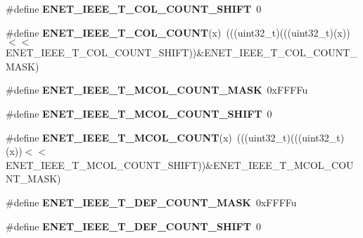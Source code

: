 \begin{DoxyCompactItemize}
\item 
\#define {\bfseries E\+N\+E\+T\+\_\+\+I\+E\+E\+E\+\_\+\+T\+\_\+C\+O\+L\+\_\+\+C\+O\+U\+N\+T\+\_\+\+S\+H\+I\+FT}~0\hypertarget{group__ENET__Register__Masks_ga5d76cc219ed04226ca7b8049d9acf2d6}{}\label{group__ENET__Register__Masks_ga5d76cc219ed04226ca7b8049d9acf2d6}

\item 
\#define {\bfseries E\+N\+E\+T\+\_\+\+I\+E\+E\+E\+\_\+\+T\+\_\+C\+O\+L\+\_\+\+C\+O\+U\+NT}(x)~(((uint32\+\_\+t)(((uint32\+\_\+t)(x))$<$$<$E\+N\+E\+T\+\_\+\+I\+E\+E\+E\+\_\+\+T\+\_\+C\+O\+L\+\_\+\+C\+O\+U\+N\+T\+\_\+\+S\+H\+I\+FT))\&E\+N\+E\+T\+\_\+\+I\+E\+E\+E\+\_\+\+T\+\_\+C\+O\+L\+\_\+\+C\+O\+U\+N\+T\+\_\+\+M\+A\+SK)\hypertarget{group__ENET__Register__Masks_gae4425db78c38e5e711a6fbcf76808d9d}{}\label{group__ENET__Register__Masks_gae4425db78c38e5e711a6fbcf76808d9d}

\item 
\#define {\bfseries E\+N\+E\+T\+\_\+\+I\+E\+E\+E\+\_\+\+T\+\_\+\+M\+C\+O\+L\+\_\+\+C\+O\+U\+N\+T\+\_\+\+M\+A\+SK}~0x\+F\+F\+F\+Fu\hypertarget{group__ENET__Register__Masks_ga8c5aa3e3b3754724a33b871ec266dfae}{}\label{group__ENET__Register__Masks_ga8c5aa3e3b3754724a33b871ec266dfae}

\item 
\#define {\bfseries E\+N\+E\+T\+\_\+\+I\+E\+E\+E\+\_\+\+T\+\_\+\+M\+C\+O\+L\+\_\+\+C\+O\+U\+N\+T\+\_\+\+S\+H\+I\+FT}~0\hypertarget{group__ENET__Register__Masks_gafc71cbe43a3a04af9ab56efe38f08b82}{}\label{group__ENET__Register__Masks_gafc71cbe43a3a04af9ab56efe38f08b82}

\item 
\#define {\bfseries E\+N\+E\+T\+\_\+\+I\+E\+E\+E\+\_\+\+T\+\_\+\+M\+C\+O\+L\+\_\+\+C\+O\+U\+NT}(x)~(((uint32\+\_\+t)(((uint32\+\_\+t)(x))$<$$<$E\+N\+E\+T\+\_\+\+I\+E\+E\+E\+\_\+\+T\+\_\+\+M\+C\+O\+L\+\_\+\+C\+O\+U\+N\+T\+\_\+\+S\+H\+I\+FT))\&E\+N\+E\+T\+\_\+\+I\+E\+E\+E\+\_\+\+T\+\_\+\+M\+C\+O\+L\+\_\+\+C\+O\+U\+N\+T\+\_\+\+M\+A\+SK)\hypertarget{group__ENET__Register__Masks_ga4cc2d69b86d1de93eb581bb43d37b243}{}\label{group__ENET__Register__Masks_ga4cc2d69b86d1de93eb581bb43d37b243}

\item 
\#define {\bfseries E\+N\+E\+T\+\_\+\+I\+E\+E\+E\+\_\+\+T\+\_\+\+D\+E\+F\+\_\+\+C\+O\+U\+N\+T\+\_\+\+M\+A\+SK}~0x\+F\+F\+F\+Fu\hypertarget{group__ENET__Register__Masks_gaa51a7b5a53afb1d47cba1d900f9bf34f}{}\label{group__ENET__Register__Masks_gaa51a7b5a53afb1d47cba1d900f9bf34f}

\item 
\#define {\bfseries E\+N\+E\+T\+\_\+\+I\+E\+E\+E\+\_\+\+T\+\_\+\+D\+E\+F\+\_\+\+C\+O\+U\+N\+T\+\_\+\+S\+H\+I\+FT}~0\hypertarget{group__ENET__Register__Masks_gabbce06689e842f4caf2a19b2df8893c6}{}\label{group__ENET__Register__Masks_gabbce06689e842f4caf2a19b2df8893c6}


\end{DoxyCompactItemize}

